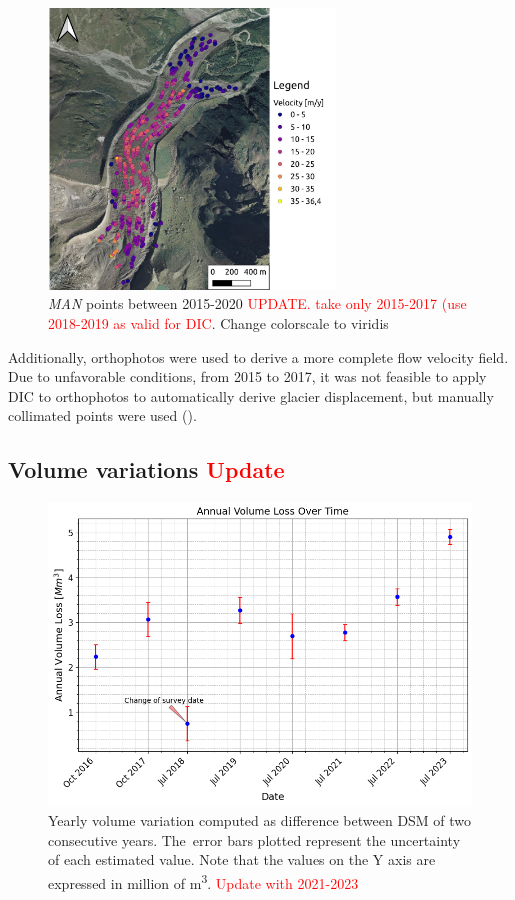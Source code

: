 \begin{figure}[ht!]
    \centering
    \includegraphics[width=0.68\textwidth]{man_points_2015-2020}
    \caption{\textit{MAN} points between 2015-2020 \textcolor{red}{UPDATE. take only 2015-2017 (use 2018-2019 as valid for DIC}. Change colorscale to viridis}
    \label{fig:3:MAN_points_all}
\end{figure}

Additionally, orthophotos were used to derive a more complete flow velocity field.
Due to unfavorable conditions, from 2015 to 2017, it was not feasible to apply DIC to orthophotos
to automatically derive glacier displacement, but manually collimated points were used (). 



\subsection{Volume variations \textcolor{red}{Update}}\label{sec:3:res:volumes}

\begin{figure}
    \centering
    \includegraphics[width=0.8\columnwidth]{volume_loss_2015-2023.png}
    \caption{Yearly volume variation computed as difference between DSM of two
        consecutive years. The~error bars plotted represent the uncertainty of each
        estimated value. Note that the values on the Y axis are expressed in million of
        \si{\cubic\meter}. \textcolor{red}{Update with 2021-2023}}
    \label{fig:3:volumes}
\end{figure}

